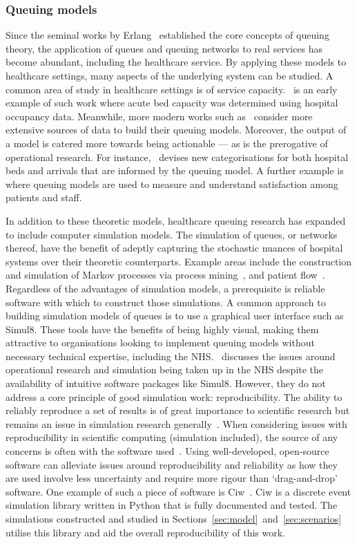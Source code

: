 \documentclass[11pt]{article}
\begin{document}
\subsubsection{Queuing models}

Since the seminal works by Erlang~\cite{Erlang1917,Erlang1920} established the
core concepts of queuing theory, the application of queues and queuing networks
to real services has become abundant, including the healthcare service. By
applying these models to healthcare settings, many aspects of the underlying
system can be studied. A common area of study in healthcare settings is of
service capacity.~\cite{McClain1976} is an early example of such work where
acute bed capacity was determined using hospital occupancy data. Meanwhile, more
modern works such as~\cite{Palvannan2012,Pinto2014} consider more extensive
sources of data to build their queuing models.  Moreover, the output of a model
is catered more towards being actionable --- as is the prerogative of
operational research. For instance,~\cite{Pinto2014} devises new categorisations
for both hospital beds and arrivals that are informed by the queuing model. A
further example is~\cite{Komashie2015} where queuing models are used to measure
and understand satisfaction among patients and staff.

In addition to these theoretic models, healthcare queuing research has expanded
to include computer simulation models. The simulation of queues, or networks
thereof, have the benefit of adeptly capturing the stochastic nuances of
hospital systems over their theoretic counterparts. Example areas include the
construction and simulation of Markov processes via process
mining~\cite{Arnolds2018,Rebuge2012}, and patient flow~\cite{Bhattacharjee2014}.
Regardless of the advantages of simulation models, a prerequisite is reliable
software with which to construct those simulations. A common approach to
building simulation models of queues is to use a graphical user interface such
as Simul8. These tools have the benefits of being highly visual, making them
attractive to organisations looking to implement queuing models without
necessary technical expertise, including the NHS.~\cite{Brailsford2013}
discusses the issues around operational research and simulation being taken up
in the NHS despite the availability of intuitive software packages like Simul8.
However, they do not address a core principle of good simulation work:
reproducibility. The ability to reliably reproduce a set of results is of great
importance to scientific research but remains an issue in simulation research
generally~\cite{Fitzpatrick2019}. When considering issues with reproducibility
in scientific computing (simulation included), the source of any concerns is
often with the software used~\cite{Ivie2018}. Using well-developed, open-source
software can alleviate issues around reproducibility and reliability as how they
are used involve less uncertainty and require more rigour than ‘drag-and-drop’
software. One example of such a piece of software is Ciw~\cite{Palmer2019}. Ciw
is a discrete event simulation library written in Python that is fully
documented and tested. The simulations constructed and studied in
Sections~\ref{sec:model}~and~\ref{sec:scenarios} utilise this library and aid
the overall reproducibility of this work.
\end{document}
